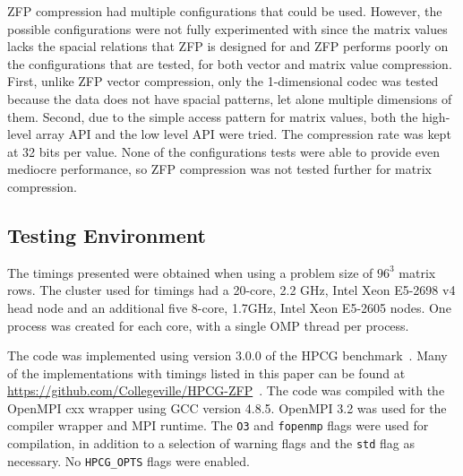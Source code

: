 ZFP compression had multiple configurations that could be used.
However, the possible configurations were not fully experimented with since the matrix values lacks the spacial relations that ZFP is designed for and ZFP performs poorly on the configurations that are tested, for both vector and matrix value compression.
First, unlike ZFP vector compression, only the 1-dimensional codec was tested because the data does not have spacial patterns, let alone multiple dimensions of them.
Second, due to the simple access pattern for matrix values, both the high-level array API and the low level API were tried.
The compression rate was kept at 32 bits per value.
None of the configurations tests were able to provide even mediocre performance, so ZFP compression was not tested further for matrix compression.

\subsection{Testing Environment}
The timings presented were obtained when using a problem size of \(96^3\) matrix rows.
The cluster used for timings had a 20-core, 2.2 GHz, Intel Xeon E5-2698 v4 head node and an additional five 8-core, 1.7GHz, Intel Xeon E5-2605 nodes.
One process was created for each core, with a single OMP thread per process.

The code was implemented using version 3.0.0 of the HPCG benchmark~\cite{Dongarra:2015:HPCG}.
Many of the implementations with timings listed in this paper can be found at \url{https://github.com/Collegeville/HPCG-ZFP}~\cite{Lindquist:2018:projectGithub}.
The code was compiled with the OpenMPI cxx wrapper using GCC version 4.8.5.
OpenMPI 3.2 was used for the compiler wrapper and MPI runtime.
The \texttt{O3} and \texttt{fopenmp} flags were used for compilation, in addition to a selection of warning flags and the \texttt{std} flag as necessary.
No \texttt{HPCG\_OPTS} flags were enabled.